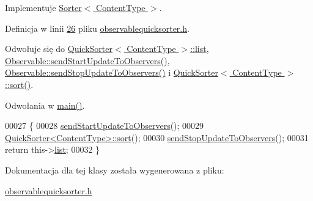 Implementuje \hyperlink{class_sorter_a880cfd8969b78557ed207ad6f2bd4819}{Sorter$<$ Content\-Type $>$}.



Definicja w linii \hyperlink{observablequicksorter_8h_source_l00026}{26} pliku \hyperlink{observablequicksorter_8h_source}{observablequicksorter.\-h}.



Odwołuje się do \hyperlink{quicksorter_8h_source_l00023}{Quick\-Sorter$<$ Content\-Type $>$\-::list}, \hyperlink{observable_8h_source_l00029}{Observable\-::send\-Start\-Update\-To\-Observers()}, \hyperlink{observable_8h_source_l00039}{Observable\-::send\-Stop\-Update\-To\-Observers()} i \hyperlink{quicksorter_8h_source_l00067}{Quick\-Sorter$<$ Content\-Type $>$\-::sort()}.



Odwołania w \hyperlink{main_8cpp_source_l00022}{main()}.


\begin{DoxyCode}
00027         \{
00028                 \hyperlink{class_observable_a78df64057f152342a43f27979186a6ba}{sendStartUpdateToObservers}();
00029                 \hyperlink{class_quick_sorter_a86cadfe5f5b9fbdf6e9eacb0b7dbc83d}{QuickSorter<ContentType>::sort}();
00030                 \hyperlink{class_observable_a16f75ed1514a0cb7526b5a5d2b7ca7c6}{sendStopUpdateToObservers}();
00031                 \textcolor{keywordflow}{return} this->\hyperlink{class_quick_sorter_a66cd768b6d8a77952f004be7aad87a0e}{list};
00032         \}
\end{DoxyCode}


Dokumentacja dla tej klasy została wygenerowana z pliku\-:\begin{DoxyCompactItemize}
\item 
\hyperlink{observablequicksorter_8h}{observablequicksorter.\-h}\end{DoxyCompactItemize}
